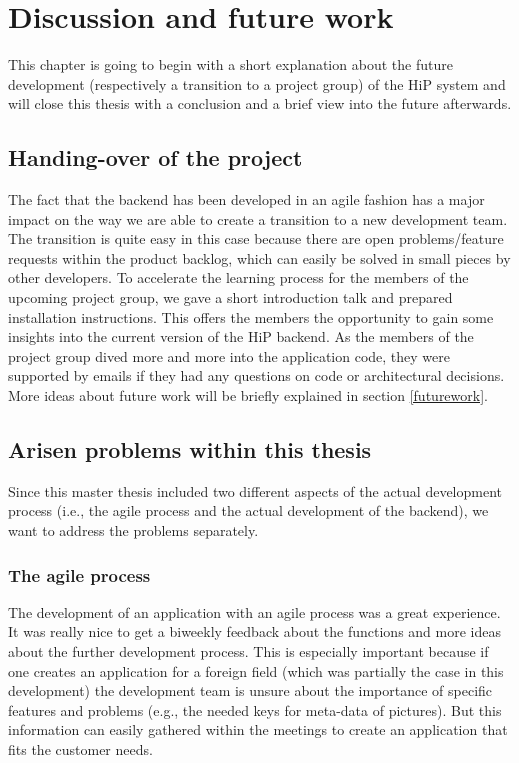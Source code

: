 \chapter[Discussion and future work]{Discussion and future work}
\label{discussion}
This chapter is going to begin with a short explanation about the future development (respectively a transition to a project group) of the \ac{HiP} system and will close this thesis with a conclusion and a brief view into the future afterwards. 

\section{Handing-over of the project}
The fact that the backend has been developed in an agile fashion has a major impact on the way we are able to create a transition to a new development team. The transition is quite easy in this case because there are open problems/feature requests within the product backlog, which can easily be solved in small pieces by other developers. To accelerate the learning process for the members of the upcoming project group, we gave a short introduction talk and prepared installation instructions. This offers the members the opportunity to gain some insights into the current version of the \ac{HiP} backend. As the members of the project group dived more and more into the application code, they were supported by emails if they had any questions on code or architectural decisions. More ideas about future work will be briefly explained in section \ref{futurework}. 

\section{Arisen problems within this thesis}
Since this master thesis included two different aspects of the actual development process (i.e., the agile process and the actual development of the backend), we want to address the problems separately. 

\subsection{The agile process}
The development of an application with an agile process was a great experience. It was really nice to get a biweekly feedback about the functions and more ideas about the further development process. This is especially important because if one creates an application for a foreign field (which was partially the case in this development) the development team is unsure about the importance of specific features and problems (e.g., the needed keys for meta-data of pictures). But this information can easily gathered within the meetings to create an application that fits the customer needs. 

